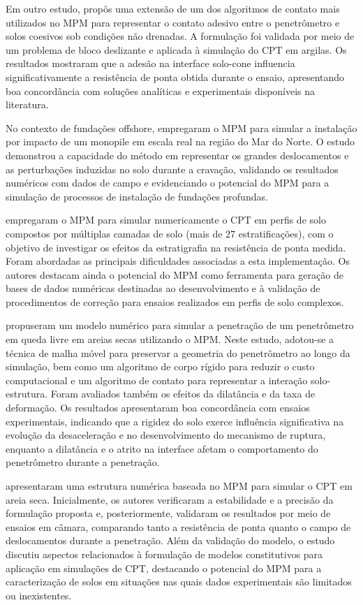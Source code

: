 Em outro estudo,  propôs uma extensão de um dos algoritmos de contato mais utilizados no MPM para representar o contato adesivo entre o penetrômetro e solos coesivos sob condições não drenadas. A formulação foi validada por meio de um problema de bloco deslizante e aplicada à simulação do CPT em argilas. Os resultados mostraram que a adesão na interface solo-cone influencia significativamente a resistência de ponta obtida durante o ensaio, apresentando boa concordância com soluções analíticas e experimentais disponíveis na literatura.

No contexto de fundações offshore,  empregaram o MPM para simular a instalação por impacto de um monopile em escala real na região do Mar do Norte. O estudo demonstrou a capacidade do método em representar os grandes deslocamentos e as perturbações induzidas no solo durante a cravação, validando os resultados numéricos com dados de campo e evidenciando o potencial do MPM para a simulação de processos de instalação de fundações profundas.

 empregaram o MPM para simular numericamente o CPT em perfis de solo compostos por múltiplas camadas de solo (mais de 27 estratificações), com o objetivo de investigar os efeitos da estratigrafia na resistência de ponta medida. Foram abordadas as principais dificuldades associadas a esta implementação. Os autores destacam ainda o potencial do MPM como ferramenta para geração de bases de dados numéricas destinadas ao desenvolvimento e à validação de procedimentos de correção para ensaios realizados em perfis de solo complexos.

 propuseram um modelo numérico para simular a penetração de um penetrômetro em queda livre em areias secas utilizando o MPM. Neste estudo, adotou-se a técnica de malha móvel para preservar a geometria do penetrômetro ao longo da simulação, bem como um algoritmo de corpo rígido para reduzir o custo computacional e um algoritmo de contato para representar a interação solo-estrutura. Foram avaliados também os efeitos da dilatância e da taxa de deformação. Os resultados apresentaram boa concordância com ensaios experimentais, indicando que a rigidez do solo exerce influência significativa na evolução da desaceleração e no desenvolvimento do mecanismo de ruptura, enquanto a dilatância e o atrito na interface afetam o comportamento do penetrômetro durante a penetração.

 apresentaram uma estrutura numérica baseada no MPM para simular o CPT em areia seca. Inicialmente, os autores verificaram a estabilidade e a precisão da formulação proposta e, posteriormente, validaram os resultados por meio de ensaios em câmara, comparando tanto a resistência de ponta quanto o campo de deslocamentos durante a penetração. Além da validação do modelo, o estudo discutiu aspectos relacionados à formulação de modelos constitutivos para aplicação em simulações de CPT, destacando o potencial do MPM para a caracterização de solos em situações nas quais dados experimentais são limitados ou inexistentes.

